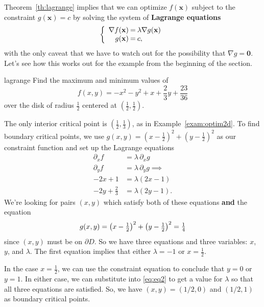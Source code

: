 \documentclass[indent]{watsonbook}
\begin{document}
{\bang{15mm}
Theorem~\ref{th:lagrange} implies that we can optimize $f(\mathbf{x})$ subject
to the constraint $g(\mathbf{x}) = c$ by solving the system of \textbf{Lagrange
  equations}
\[
  \left\{
    \begin{array}{r@{\:}c@{\:}l}
      \nabla f (\mathbf{x}) &=& \lambda \nabla g (\mathbf{x})\\
      g(\mathbf{x}) &=& c,
    \end{array}
  \right.
\]
with the only caveat that we have to watch out for the possibility
that $\nabla g = \mathbf{0}$. Let's see how this works out for the
example from the beginning of the section.


\begin{example}{}{lagrange}
  Find the maximum and minimum values of
  \[f(x,y) = -x^2 - y^2 + x + \frac{2}{3} y + \frac{23}{36}\]
  over the disk of radius $\tfrac{1}{2}$ centered at $\left(
    \tfrac{1}{2}, \tfrac{1}{2}\right)$.
\end{example}

\begin{solution}
  The only interior critical point is
  $\left(\tfrac{1}{2},\tfrac{1}{3}\right)$, as in
  Example~\ref{exam:optim2d}. To find boundary critical points, we
  use
  $g(x,y) = \left(x-\frac{1}{2}\right)^2 + \left(y -
    \frac{1}{2}\right)^2$ as our constraint function and set up the
  Lagrange equations
  \begin{align} \nonumber
    \partial_x f &= \lambda \, \partial_x g \\ \nonumber
    \partial_y f &= \lambda \, \partial_y g \implies \\
    -2x + 1 &= \lambda(2x - 1)  \\ \label{eq:eq2}
    -2y + \tfrac{2}{3} &= \lambda(2y-1).
  \end{align}
  We're looking for pairs $(x,y)$ which satisfy both of these
  equations \textbf{and} the equation
  \begin{equation}
    g(x,y) = \left(x-\tfrac{1}{2}\right)^2 +
    \left(y-\tfrac{1}{2}\right)^2 = \tfrac{1}{4} \\
  \end{equation}
  since
  $(x,y)$ must be on $\partial D$. So we have three equations and three
  variables: $x$, $y$, and $\lambda$. The first equation implies
  that either $\lambda = -1$ or $x = \tfrac{1}{2}$.

  In the case $x = \frac{1}{2}$, we can use the constraint equation
  to conclude that $y = 0$ or $y = 1$. In either case, we can
  substitute into \eqref{eq:eq2} to get a value for $\lambda$ so
  that all three equations are satisfied. So, we have
  $(x,y) = (1/2, 0)$ and $(1/2,1)$ as boundary critical points.


\end{solution}}
\end{document}
